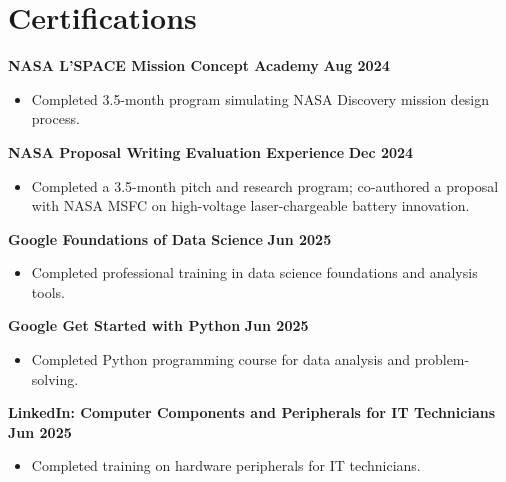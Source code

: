 \documentclass[letterpaper,11pt]{article}
\begin{document}
\section*{Certifications}
\textbf{NASA L'SPACE Mission Concept Academy} \hfill \textbf{Aug 2024}
\begin{itemize}
    \item Completed 3.5-month program simulating NASA Discovery mission design process.
\end{itemize}
\vspace{4mm}
\textbf{NASA Proposal Writing Evaluation Experience} \hfill \textbf{Dec 2024}
\begin{itemize}
    \item Completed a 3.5-month pitch and research program; co-authored a proposal with NASA MSFC on high-voltage laser-chargeable battery innovation.
\end{itemize}
\vspace{4mm}
\textbf{Google Foundations of Data Science} \hfill \textbf{Jun 2025}
\begin{itemize}
    \item Completed professional training in data science foundations and analysis tools.
\end{itemize}
\vspace{4mm}
\textbf{Google Get Started with Python} \hfill \textbf{Jun 2025}
\begin{itemize}
    \item Completed Python programming course for data analysis and problem-solving.
\end{itemize}
\vspace{4mm}
\textbf{LinkedIn: Computer Components and Peripherals for IT Technicians} \hfill \textbf{Jun 2025}
\begin{itemize}
    \item Completed training on hardware peripherals for IT technicians.
\end{itemize}
\vspace{4mm}
\end{document}
